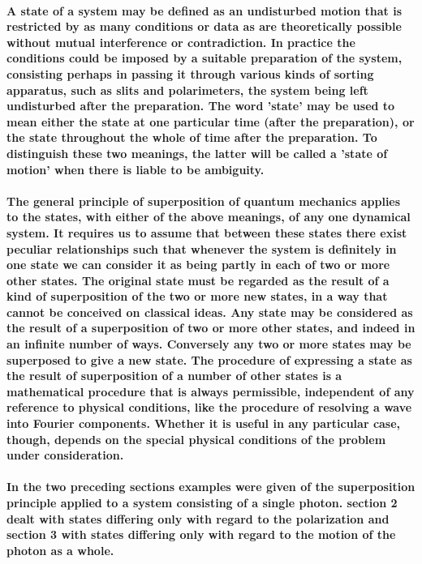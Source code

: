\documentclass[10pt, kindle, oneside]{kindle}
\begin{document}
\paragraph{A state of a system may be defined as an undisturbed motion that is restricted by as many conditions or data as are theoretically possible without mutual interference or contradiction. In practice the conditions could be imposed by a suitable preparation of the system, consisting perhaps in passing it through various kinds of sorting apparatus, such as slits and polarimeters, the system being left undisturbed after the preparation. The word 'state' may be used to mean either the state at one particular time (after the preparation), or the state throughout the whole of time after the preparation. To distinguish these two meanings, the latter will be called a 'state of motion' when there is liable to be ambiguity.}
\paragraph{The general principle of superposition of quantum mechanics applies to the states, with either of the above meanings, of any one dynamical system. It requires us to assume that between these states there exist peculiar relationships such that whenever the system is definitely in one state we can consider it as being partly in each of two or more other states. The original state must be regarded as the result of a kind of superposition of the two or more new states, in a way that cannot be conceived on classical ideas. Any state may be considered as the result of a superposition of two or more other states, and indeed in an infinite number of ways. Conversely any two or more states may be superposed to give a new state. The procedure of expressing a state as the result of superposition of a number of other states is a mathematical procedure that is always permissible, independent of any reference to physical conditions, like the procedure of resolving a wave into Fourier components. Whether it is useful in any particular case, though, depends on the special physical conditions of the problem under consideration.}
\paragraph{In the two preceding sections examples were given of the superposition principle applied to a system consisting of a single photon. section 2 dealt with states differing only with regard to the polarization and section 3 with states differing only with regard to the motion of the photon as a whole.}
\end{document}
